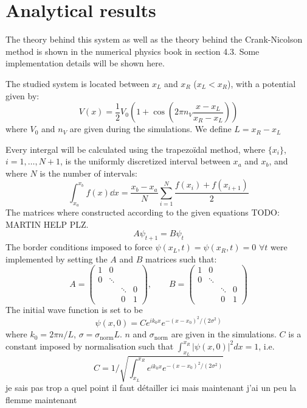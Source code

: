 \section{Analytical results}

The theory behind this system as well as the theory behind the Crank-Nicolson method is shown in the numerical physics book \cite{physnumbook} in section 4.3. Some implementation details will be shown here.

The studied system is located between \(x_L\) and \(x_R\) (\(x_L < x_R\)), with a potential given by:
\begin{equation}
    V(x) = \frac{1}{2} V_0 \left( 1 + \cos \left( 2\pi n_V \frac{x - x_L}{x_R - x_L} \right) \right)
\end{equation}
where \(V_0\) and \(n_V\) are given during the simulations. We define \(L = x_R - x_L\)

Every intergal will be calculated using the trapezoïdal method, where \(\{x_i\}\), \(i = 1, \dots, N+1\), is the uniformly discretized interval between \(x_a\) and \(x_b\), and where \(N\) is the number of intervals:
\begin{equation}
    \int_{x_a}^{x_b} f(x) \dd x = \frac{x_b - x_a}{N} \sum_{i=1}^N \frac{f(x_i) + f(x_{i+1})}{2}
\end{equation}
The matrices where constructed according to the given equations TODO: MARTIN HELP PLZ.
\begin{equation}
    A \psi_{t+1} = B \psi_t
\end{equation}
The border conditions imposed to force \(\psi(x_L, t) = \psi(x_R, t) = 0\,\, \forall t\) were implemented by setting the \(A\) and \(B\) matrices such that:
\begin{equation}
    A = \left( \begin{matrix}
        1 & 0      &        &   \\
        0 & \ddots &        &   \\
          &        & \ddots & 0 \\
          &        & 0      & 1
    \end{matrix} \right)
    ,\qquad
    B = \left( \begin{matrix}
        1 & 0      &        &   \\
        0 & \ddots &        &   \\
          &        & \ddots & 0 \\
          &        & 0      & 1
    \end{matrix} \right)
\end{equation}
The initial wave function is set to be
\begin{equation}
    \psi(x, 0) = C e^{i k_0 x} e^{-(x-x_0)^2/(2 \sigma^2)}
\end{equation}
where \(k_0 = 2 \pi n / L\), \(\sigma = \sigma_{\textrm{norm}} L\). \(n\) and \(\sigma_\textrm{norm}\) are given in the simulations. \(C\) is a constant imposed by normalisation such that \(\int_{x_L}^{x_R}|\psi(x,0)|^2 dx = 1\), i.e.
\begin{equation}
    C = 1/\sqrt{\int_{x_L}^{x_R} e^{i k_0 x} e^{-(x-x_0)^2/(2 \sigma^2)}}
\end{equation}
je sais pas trop a quel point il faut détailler ici mais maintenant j'ai un peu la flemme maintenant